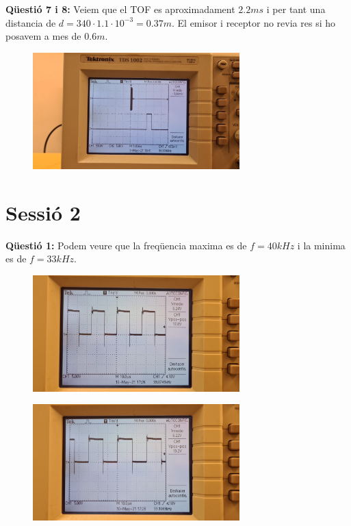 \documentclass[12pt, a4papre]{article}
\begin{document}
	\textbf{Qüestió 7 i 8:} Veiem que el TOF es aproximadament $2.2ms$ i per tant una distancia de $d = 340\cdot 1.1 \cdot 10^{-3} = 0.37m$. El emisor i receptor no revia res si ho posavem a mes de $0.6m$.
	
	\begin{figure}[H]
		\begin{center}
		\includegraphics[width=80mm]{p4_5.jpeg}
		\end{center}
	\end{figure}
	
	\section{Sessió 2}
	
	\textbf{Qüestió 1:} Podem veure que la freqüencia maxima es de $f = 40kHz$ i la minima es de $f = 33kHz$.
	
	\begin{figure}[H]
		\begin{center}
		\includegraphics[width=80mm]{4_7_M.jpeg}
		\end{center}
	\end{figure}
	
	\begin{figure}[H]
		\begin{center}
		\includegraphics[width=80mm]{4_7_min.jpeg}
		\end{center}
	\end{figure}
	
\end{document}
